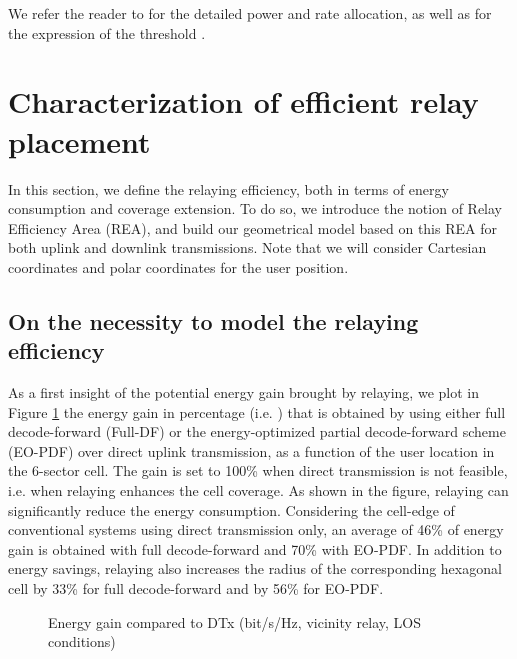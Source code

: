 \documentclass[journal]{IEEEtran}
\theoremstyle{definition}
\begin{document}
We refer the reader to \cite{Journal1} for the detailed power and rate allocation, as well as for the expression of  the threshold .



\section{Characterization of efficient relay placement}
\label{sec:model}

In this section, we define the relaying efficiency, both in terms of energy consumption and coverage extension. To do so, we introduce the notion of Relay Efficiency Area (REA), and build our geometrical model based on this REA for both uplink and downlink transmissions. Note that we will consider Cartesian coordinates  and polar coordinates  for the user position.

\subsection{On the necessity to model the relaying efficiency}

As a first insight of the potential energy gain brought by relaying, we plot in Figure \ref{fig:Energy_gain} the energy gain in percentage (i.e. ) that is obtained by using either full decode-forward (Full-DF) or the energy-optimized partial decode-forward scheme (EO-PDF) over direct uplink transmission, as a function of the user location in the 6-sector cell. The gain is set to 100\% when direct transmission is not feasible, i.e. when relaying enhances the cell coverage.
As shown in the figure, relaying can significantly reduce the energy consumption.
Considering the cell-edge of conventional systems using direct transmission only,
an average of 46\% of energy gain is obtained with full decode-forward and 70\% with EO-PDF. In addition to energy savings, relaying also increases the radius of the corresponding hexagonal cell by 33\% for full decode-forward and by 56\% for EO-PDF.

\begin{figure}
	{\centering
	 \caption{Energy gain compared to DTx (bit/s/Hz, vicinity relay, LOS conditions)}  
	\label{fig:Energy_gain} 
	}
\end{figure}
\end{document}

